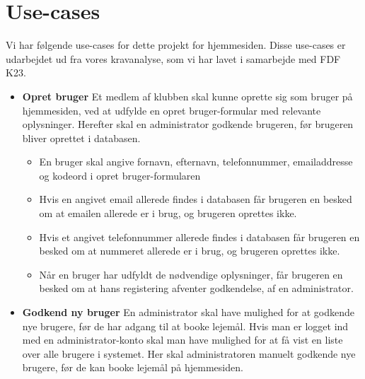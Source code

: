 \documentclass[12pt,a4paper]{report} %
\begin{document}
    \newpage
    \section{Use-cases}
    Vi har følgende use-cases for dette projekt for hjemmesiden. Disse use-cases er udarbejdet ud fra vores kravanalyse, som vi har lavet i samarbejde med FDF K23.
    
    \begin{itemize}
        \item \textbf{Opret bruger\newline}
        Et medlem af klubben skal kunne oprette sig som bruger på hjemmesiden, ved at udfylde en opret bruger-formular med relevante oplysninger. Herefter skal en administrator godkende brugeren, før brugeren bliver oprettet i databasen. 
        \begin{itemize}
            \item En bruger skal angive fornavn, efternavn, telefonnummer, emailaddresse og kodeord i opret bruger-formularen
            \item Hvis en angivet email allerede findes i databasen får brugeren en besked om at emailen allerede er i brug, og brugeren oprettes ikke. 
            \item Hvis et angivet telefonnummer allerede findes i databasen får brugeren en besked om at nummeret allerede er i brug, og brugeren oprettes ikke. 
            \item Når en bruger har udfyldt de nødvendige oplysninger, får brugeren en besked om at hans registering afventer godkendelse, af en administrator. 
        \end{itemize}
        \item \textbf{Godkend ny bruger\newline}
        En administrator skal have mulighed for at godkende nye brugere, før de har adgang til at booke lejemål. Hvis man er logget ind med en administrator-konto skal man have mulighed for at få vist en liste over alle brugere i systemet. Her skal administratoren manuelt godkende nye brugere, før de kan booke lejemål på hjemmesiden. 
        

\end{itemize}
\end{document}
